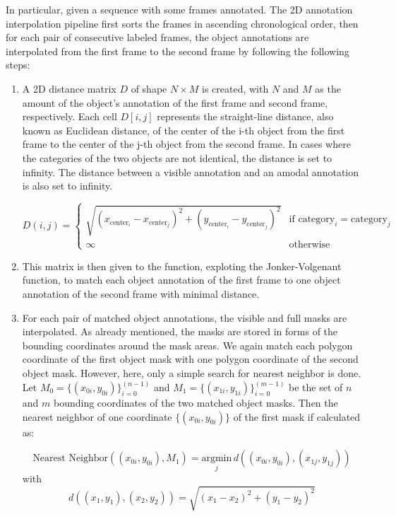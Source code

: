 In particular, given a sequence with some frames annotated. The 2D annotation interpolation pipeline first sorts the frames in ascending chronological order, then for each pair of consecutive labeled frames, the object annotations are interpolated from the first frame to the second frame by following the following steps: 
\begin{enumerate}
	\item A 2D distance matrix $D$ of shape $N \times M$  is created, with $N$ and $M$ as the amount of the object's annotation of the first frame and second frame, respectively. Each cell $D[i,j]$ represents the straight-line distance, also known as Euclidean distance, of the center of the i-th object from the first frame to the center of the j-th object from the second frame. In cases where the categories of the two objects are not identical, the distance is set to infinity. The distance between a visible annotation and an amodal annotation is also set to infinity. 
	
	\[ D(i,j) = \begin{cases} 
		\sqrt{{(x_{\text{{center}}_i} - x_{\text{{center}}_j})^2 + (y_{\text{{center}}_i} - y_{\text{{center}}_j})^2}} & \text{if } \text{{category}}_i = \text{{category}}_j \\
		\infty & \text{otherwise}
	\end{cases} \]
	
	\item This matrix is then given to the  function, exploting  the Jonker-Volgenant function, to match each object annotation of the first frame to one object annotation of the second frame with minimal distance.
	
	\item For each pair of matched object annotations, the visible and full masks are interpolated. As already mentioned, the masks are stored in forms of the bounding coordinates around the mask areas. We again match each polygon coordinate of the first object mask with one polygon coordinate of the second object mask. However, here, only a simple search for nearest neighbor is done. Let \( M_0 = \{(x_{0i}, y_{0i})\}_{i=0}^{(n-1)} \) and \( M_1 = \{(x_{1i}, y_{1i})\}_{i=0}^{(m-1)} \) be the set of \( n \) and  \( m \) bounding coordinates of the two matched object masks. Then the nearest neighbor of one coordinate  \(\{(x_{0i}, y_{0i})\}\) of the first mask if calculated as: 
	
	\[ \text{Nearest Neighbor}((x_{0i}, y_{0i}), M_1) = \underset{j}{\text{argmin}} \, d((x_{0i}, y_{0i}), (x_{1j}, y_{1j})) \]  with 
	\[ d((x_1, y_1), (x_2, y_2)) = \sqrt{(x_1 - x_2)^2 + (y_1 - y_2)^2} \]
	

\end{enumerate}

